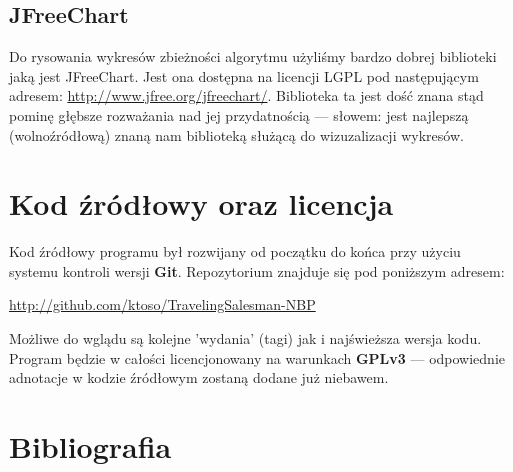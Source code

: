 \documentclass[a4paper]{article}
\begin{document}
\subsection{JFreeChart}
Do rysowania wykresów zbieżności algorytmu użyliśmy bardzo dobrej biblioteki jaką jest JFreeChart. Jest ona dostępna na licencji LGPL pod następującym adresem: \href{http://www.jfree.org/jfreechart/}{http://www.jfree.org/jfreechart/}. Biblioteka ta jest dość znana stąd pominę głębsze rozważania nad jej przydatnością --- słowem: jest najlepszą (wolnoźródłową) znaną nam biblioteką służącą do wizuzalizacji wykresów.

\section{Kod źródłowy oraz licencja}
Kod źródłowy programu był rozwijany od początku do końca przy użyciu systemu kontroli wersji \textbf{Git}. Repozytorium znajduje się pod poniższym adresem:

\begin{flushleft}
 \href{http://github.com/ktoso/TravelingSalesman-NBP}{http://github.com/ktoso/TravelingSalesman-NBP}
\end{flushleft}

Możliwe do wglądu są kolejne 'wydania' (tagi) jak i najświeższa wersja kodu. Program będzie w całości licencjonowany na warunkach \textbf{GPLv3} --- odpowiednie adnotacje w kodzie źródłowym zostaną dodane już niebawem.

\section{Bibliografia}
\end{document}
